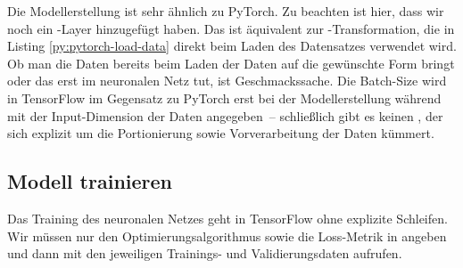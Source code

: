 
Die Modellerstellung ist sehr ähnlich zu PyTorch. Zu beachten ist hier, dass 
wir noch ein -Layer hinzugefügt haben. Das ist äquivalent zur 
-Transformation, die in Listing \ref{py:pytorch-load-data} direkt beim 
Laden des Datensatzes verwendet wird. 
Ob man die Daten bereits beim Laden der Daten auf die gewünschte Form bringt oder das 
erst im neuronalen Netz tut, ist Geschmackssache. 
Die Batch-Size wird in TensorFlow im Gegensatz zu PyTorch erst bei der Modellerstellung 
während  mit der Input-Dimension der Daten angegeben~-- schließlich gibt es 
keinen , der sich explizit um die Portionierung sowie Vorverarbeitung 
der Daten kümmert.

\vspace{2mm}

\subsection{Modell trainieren}

Das Training des neuronalen Netzes geht in TensorFlow ohne explizite Schleifen. 
Wir müssen nur den Optimierungsalgorithmus sowie die Loss-Metrik in  
angeben und dann  mit den jeweiligen Trainings- und 
Validierungsdaten aufrufen. 


\newpage

